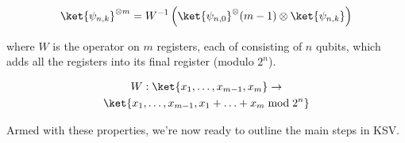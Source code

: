 \begin{equation*}
\ket{\psi_{n,k}}^{\otimes m} = W^{-1}\left( \ket{\psi_{n,0}}^\otimes(m-1) \otimes \ket{\psi_{n,k}} \right)
\end{equation*}

where $W$ is the operator on $m$ registers, each of consisting of $n$ qubits,
which adds all the registers into its final register (modulo $2^n$).

\begin{multline}
W : \ket{x_1,\ldots,x_{m-1},x_m} \rightarrow \\
 \ket{x_1,\ldots,x_{m-1},x_1+\ldots+x_m \bmod 2^n}
\end{multline}

Armed with these properties, we're now ready to outline the main steps in KSV.